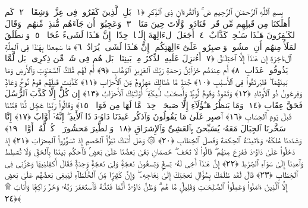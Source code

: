 
  
    
  
    
    

\nopagebreak
  بِسمِ ٱللَّهِ ٱلرَّحمَـٰنِ ٱلرَّحِيمِ
  صٓ ۚ وَٱلقُرءَانِ ذِى ٱلذِّكرِ ﴿١﴾
 بَلِ ٱلَّذِينَ كَفَرُوا۟ فِى عِزَّةٍۢ وَشِقَاقٍۢ ﴿٢﴾
 كَم أَهلَكنَا مِن قَبلِهِم مِّن قَرنٍۢ فَنَادَوا۟ وَّلَاتَ حِينَ مَنَاصٍۢ ﴿٣﴾
 وَعَجِبُوٓا۟ أَن جَآءَهُم مُّنذِرٌۭ مِّنهُم ۖ وَقَالَ ٱلكَـٰفِرُونَ هَـٰذَا سَـٰحِرٌۭ كَذَّابٌ ﴿٤﴾
 أَجَعَلَ ٱلءَالِهَةَ إِلَـٰهًۭا وَٟحِدًا ۖ إِنَّ هَـٰذَا لَشَىءٌ عُجَابٌۭ ﴿٥﴾
 وَٱنطَلَقَ ٱلمَلَأُ مِنهُم أَنِ ٱمشُوا۟ وَٱصبِرُوا۟ عَلَىٰٓ ءَالِهَتِكُم ۖ إِنَّ هَـٰذَا لَشَىءٌۭ يُرَادُ ﴿٦﴾
 مَا سَمِعنَا بِهَـٰذَا فِى ٱلمِلَّةِ ٱلءَاخِرَةِ إِن هَـٰذَآ إِلَّا ٱختِلَـٰقٌ ﴿٧﴾
 أَءُنزِلَ عَلَيهِ ٱلذِّكرُ مِنۢ بَينِنَا ۚ بَل هُم فِى شَكٍّۢ مِّن ذِكرِى ۖ بَل لَّمَّا يَذُوقُوا۟ عَذَابِ ﴿٨﴾
 أَم عِندَهُم خَزَآئِنُ رَحمَةِ رَبِّكَ ٱلعَزِيزِ ٱلوَهَّابِ ﴿٩﴾
 أَم لَهُم مُّلكُ ٱلسَّمَـٰوَٟتِ وَٱلأَرضِ وَمَا بَينَهُمَا ۖ فَليَرتَقُوا۟ فِى ٱلأَسبَٰبِ ﴿١٠﴾
 جُندٌۭ مَّا هُنَالِكَ مَهزُومٌۭ مِّنَ ٱلأَحزَابِ ﴿١١﴾
 كَذَّبَت قَبلَهُم قَومُ نُوحٍۢ وَعَادٌۭ وَفِرعَونُ ذُو ٱلأَوتَادِ ﴿١٢﴾
 وَثَمُودُ وَقَومُ لُوطٍۢ وَأَصحَـٰبُ لـَٔيكَةِ ۚ أُو۟لَـٰٓئِكَ ٱلأَحزَابُ ﴿١٣﴾
 إِن كُلٌّ إِلَّا كَذَّبَ ٱلرُّسُلَ فَحَقَّ عِقَابِ ﴿١٤﴾
 وَمَا يَنظُرُ هَـٰٓؤُلَآءِ إِلَّا صَيحَةًۭ وَٟحِدَةًۭ مَّا لَهَا مِن فَوَاقٍۢ ﴿١٥﴾
 وَقَالُوا۟ رَبَّنَا عَجِّل لَّنَا قِطَّنَا قَبلَ يَومِ ٱلحِسَابِ ﴿١٦﴾
 ٱصبِر عَلَىٰ مَا يَقُولُونَ وَٱذكُر عَبدَنَا دَاوُۥدَ ذَا ٱلأَيدِ ۖ إِنَّهُۥٓ أَوَّابٌ ﴿١٧﴾
 إِنَّا سَخَّرنَا ٱلجِبَالَ مَعَهُۥ يُسَبِّحنَ بِٱلعَشِىِّ وَٱلإِشرَاقِ ﴿١٨﴾
 وَٱلطَّيرَ مَحشُورَةًۭ ۖ كُلٌّۭ لَّهُۥٓ أَوَّابٌۭ ﴿١٩﴾
 وَشَدَدنَا مُلكَهُۥ وَءَاتَينَـٰهُ ٱلحِكمَةَ وَفَصلَ ٱلخِطَابِ ﴿٢٠﴾
 ۞ وَهَل أَتَىٰكَ نَبَؤُا۟ ٱلخَصمِ إِذ تَسَوَّرُوا۟ ٱلمِحرَابَ ﴿٢١﴾
 إِذ دَخَلُوا۟ عَلَىٰ دَاوُۥدَ فَفَزِعَ مِنهُم ۖ قَالُوا۟ لَا تَخَف ۖ خَصمَانِ بَغَىٰ بَعضُنَا عَلَىٰ بَعضٍۢ فَٱحكُم بَينَنَا بِٱلحَقِّ وَلَا تُشطِط وَٱهدِنَآ إِلَىٰ سَوَآءِ ٱلصِّرَٰطِ ﴿٢٢﴾
 إِنَّ هَـٰذَآ أَخِى لَهُۥ تِسعٌۭ وَتِسعُونَ نَعجَةًۭ وَلِىَ نَعجَةٌۭ وَٟحِدَةٌۭ فَقَالَ أَكفِلنِيهَا وَعَزَّنِى فِى ٱلخِطَابِ ﴿٢٣﴾
 قَالَ لَقَد ظَلَمَكَ بِسُؤَالِ نَعجَتِكَ إِلَىٰ نِعَاجِهِۦ ۖ وَإِنَّ كَثِيرًۭا مِّنَ ٱلخُلَطَآءِ لَيَبغِى بَعضُهُم عَلَىٰ بَعضٍ إِلَّا ٱلَّذِينَ ءَامَنُوا۟ وَعَمِلُوا۟ ٱلصَّـٰلِحَـٰتِ وَقَلِيلٌۭ مَّا هُم ۗ وَظَنَّ دَاوُۥدُ أَنَّمَا فَتَنَّـٰهُ فَٱستَغفَرَ رَبَّهُۥ وَخَرَّ رَاكِعًۭا وَأَنَابَ ۩ ﴿٢٤﴾
